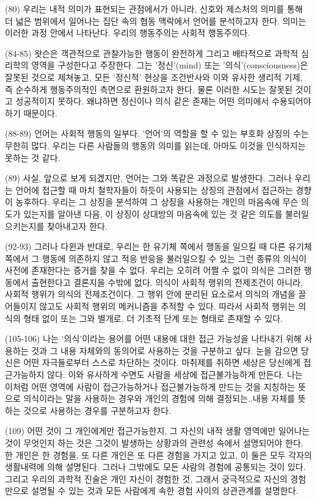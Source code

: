 \documentclass[12pt, a4paper]{article}
\begin{document}
(80) 우리는 내적 의미가 표현되는 관점에서가 아니라, 신호와 제스처의 의미를 통해 더 넓은 범위에서 일어나는 집단 속의 협동 맥락에서 언어를 분석하고자 한다. 의미는 이러한 과정 안에서 나타난다. 우리의 행동주의는 사회적 행동주의다.

(84-85) 왓슨은 객관적으로 관찰가능한 행동이 완전하게 그리고 배타적으로 과학적 심리학의 영역을 구성한다고 주장한다. 그는 '정신'(mind) 또는 '의식'(consciousness)은 잘못된 것으로 제쳐놓고, 모든 '정신적' 현상을 조건반사와 이와 유사한 생리적 기제, 즉 순수하게 행동주의적인 측면으로 환원하고자 한다. 물론 이러한 시도는 잘못된 것이고 성공적이지 못하다. 왜냐하면 정신이나 의식 같은 존재는 어떤 의미에서 수용되어야 하기 때문이다.

(88-89) 언어는 사회적 행동의 일부다. '언어'의 역할을 할 수 있는 부호화 상징의 수는 무한히 많다. 우리는 다른 사람들의 행동의 의미를 읽는데, 아마도 이것을 인식하지는 못하는 것 같다. 

(89) 사실, 앞으로 보게 되겠지만, 언어는 그와 똑같은 과정으로 발생한다. 그러나 우리는 언어에 접근할 때 마치 철학자들이 하듯이 사용되는 상징의 관점에서 접근하는 경향이 농후하다. 우리는 그 상징을 분석하여 그 상징을 사용하는 개인의 마음속에 무슨 의도가 있는지를 알아낸 다음, 이 상징이 상대방의 마음속에 있는 것 같은 의도를 불러일으키는지를 찾아내고자 한다.

(92-93) 그러나 다윈과 반대로, 우리는 한 유기체 쪽에서 행동을 일으킬 때 다른 유기체 쪽에서 그 행동에 의존하지 않고 적응 반응을 불러일으킬 수 있는 그런 종류의 의식이 사전에 존재한다는 증거를 찾을 수 없다. 우리는 오히려 어쩔 수 없이 의식은 그러한 행동에서 출현한다고 결론지을 수밖에 없다. 의식이 사회적 행위의 전제조건이 아니라, 사회적 행위가 의식의 전제조건이다. 그 행위 안에 분리된 요소로서 의식의 개념을 끌어들이지 않고도 사회적 행위의 메커니즘을 추적할 수 있다. 따라서 사회적 행위는 의식의 형태 없이 또는 그와 별개로, 더 기초적 단계 또는 형태로 존재할 수 있다.

(105-106) 나는 `의식'이라는 용어를 어떤 내용에 대한 접근 가능성을 나타내기 위해 사용하는 것과 그 내용 자체와의 동의어로 사용하는 것을 구분하고 싶다. 눈을 감으면 당신은 어떤 자극들로부터 스스로 차단하는 것이다. 마취제를 취하면 세상은 당신에게 접근가능하지 않다. 이와 유사하게 수면도 사람을 세상에 접근불가능하게 만든다. 나는 이처럼 어떤 영역에 사람이 접근가능하거나 접근불가능하게 만드는 것을 지칭하는 뜻으로 의식이라는 말을 사용하는 경우와 개인의 경험에 의해 결정되는..내용 자체를 뜻하는 것으로 사용하는 경우를 구분하고자 한다.

(109) 어떤 것이 그 개인에게만 접근가능한지, 그 자신의 내적 생활 영역에만 일어나는 것이 무엇인지 하는 것은 그것이 발생하는 상황과의 관련성 속에서 설명되어야 한다. 한 개인은 한 경험을, 또 다른 개인은 또 다른 경험을 가지고 있고, 이 둘은 모두 각자의 생활내력에 의해 설명된다. 그러나 그밖에도 모든 사람의 경험에 공통되는 것이 있다. 그리고 우리의 과학적 진술은 개인 자신이 경험한 것, 그래서 궁극적으로 자신의 경험만으로 설명될 수 있는 것과 모든 사람에게 속한 경험 사이의 상관관계를 설명한다.
\end{document}
